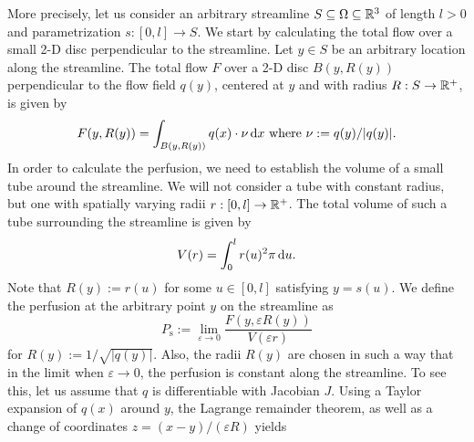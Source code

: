 \documentclass[journal,twocolumn]{IEEEtran}
\newcommand{\Perfs}{P_{\mathrm{s}}}
\begin{document}
	More precisely, let us consider an arbitrary streamline $S \subseteq \Omega \subseteq \mathbb{R}^3$ of length $l>0$ and parametrization $s:[0,l] \to S$.
	We start by calculating the total flow over a small 2-D disc perpendicular to the streamline.
	Let $y \in S$ be an arbitrary location along the streamline. 
	The total flow $F$ over a 2-D disc $B(y,R(y))$ perpendicular to the flow field $q(y)$, centered at $y$ and with radius $R:S\to\mathbb{R}^+$, is given by
	\begin{equation}
		F(y,R(y)) = \int_{B(y,R(y))} q(x) \cdot \nu \diffint x \text{ where }\nu := q(y)/\vert q(y) \vert.
		\label{eq:Fdisc}
	\end{equation}
	In order to calculate the perfusion, we need to establish the volume of a small tube around the streamline.
	We will not consider a tube with constant radius, but one with spatially varying radii $r:[0,l] \to \mathbb{R}^+$.
	The total volume of such a tube surrounding the streamline is given by
	\begin{equation}
		V(r) = \int_0^l r(u)^2 \pi \,\mathrm{d} u.
	\end{equation}
        Note that $R(y):=r(u)$ for some $u \in [0,l]$ satisfying $y=s(u)$. We define the perfusion at the arbitrary point $y$ on the streamline as
	\begin{equation}
		\Perfs:=  \lim_{\varepsilon \to 0} \frac{F(y,\varepsilon R(y))}{V(\varepsilon r)}
		\label{eq:perfusiondef}
	\end{equation}
	for $R(y):=1/\sqrt{\vert q(y) \vert}$. 
	Also, the radii $R(y)$ are chosen in such a way that in the limit when $\varepsilon \to 0$, the perfusion is constant along the streamline. 
	To see this, let us assume that $q$ is differentiable with Jacobian $J$.
	Using a Taylor expansion of $q(x)$ around $y$, the Lagrange remainder theorem, as well as a change of coordinates $z = (x-y)/(\varepsilon R)$ yields 
\end{document}
